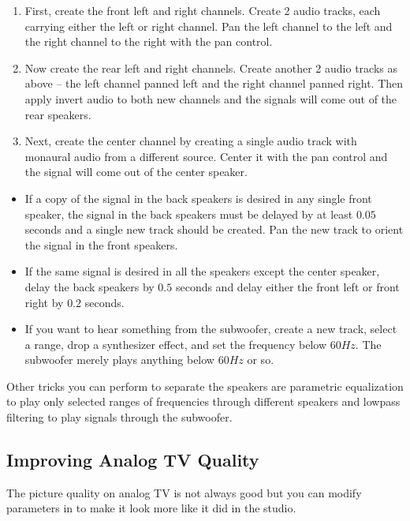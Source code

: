 \begin{enumerate}
	\item First, create the front left and right channels. Create 2 audio tracks, each carrying either the left or
	right channel. Pan the left channel to the left and the right channel to the right with the pan control.
	\item Now create the rear left and right channels. Create another 2 audio tracks as above -- the left channel
	panned left and the right channel panned right. Then apply invert audio to both new channels and
	the signals will come out of the rear speakers.
	\item Next, create the center channel by creating a single audio track with monaural audio from a
	different source. Center it with the pan control and the signal will come out of the center speaker.
\end{enumerate}

\begin{itemize}
	\item If a copy of the signal in the back speakers is desired in any single front speaker, the signal in the back
	speakers must be delayed by at least $0.05$ seconds and a single new track should be created. Pan the
	new track to orient the signal in the front speakers.
	\item If the same signal is desired in all the speakers except the center speaker, delay the back speakers by
	$0.5$ seconds and delay either the front left or front right by $0.2$ seconds.
	\item If you want to hear something from the subwoofer, create a new track, select a range, drop a
	synthesizer effect, and set the frequency below $60 Hz$. The subwoofer merely plays anything below
	$60Hz$ or so.
\end{itemize}

Other tricks you can perform to separate the speakers are parametric equalization to play only selected ranges of frequencies through different speakers and lowpass filtering to play signals through the subwoofer.

\subsection{Improving Analog TV Quality}%
\label{sub:improving_tv_quality}

The picture quality on analog TV is not always good but you can modify parameters in \CGG{} to make it look more like it did in the studio.

